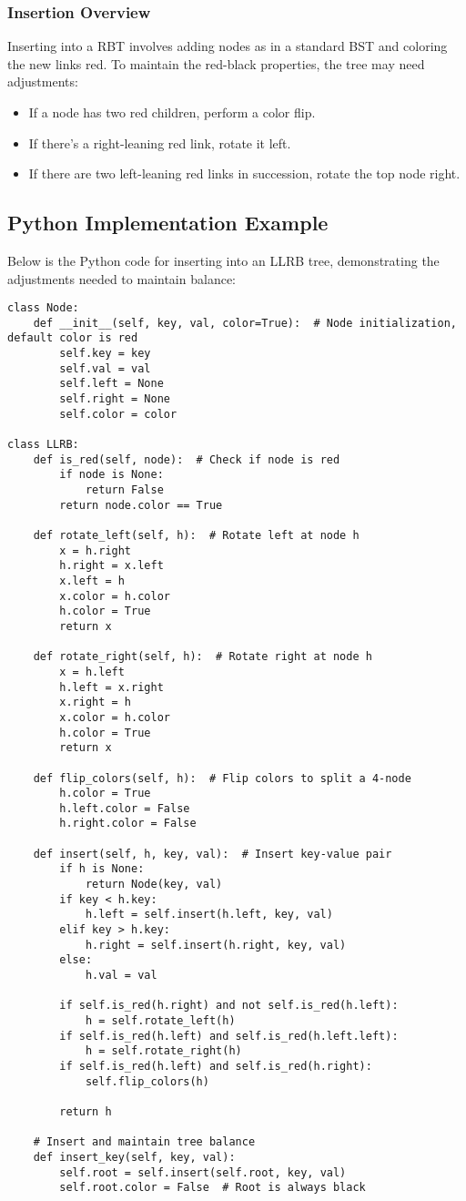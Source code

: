 \documentclass{article}
\begin{document}
\subsubsection{Insertion Overview}
Inserting into a RBT involves adding nodes as in a standard BST and coloring the new links red. To maintain the red-black properties, the tree may need adjustments:

\begin{itemize}
    \item If a node has two red children, perform a color flip.
    \item If there's a right-leaning red link, rotate it left.
    \item If there are two left-leaning red links in succession, rotate the top node right.
\end{itemize}

\subsection{Python Implementation Example}
Below is the Python code for inserting into an LLRB tree, demonstrating the adjustments needed to maintain balance:

\begin{verbatim}
class Node:
    def __init__(self, key, val, color=True):  # Node initialization, default color is red
        self.key = key
        self.val = val
        self.left = None
        self.right = None
        self.color = color

class LLRB:
    def is_red(self, node):  # Check if node is red
        if node is None:
            return False
        return node.color == True

    def rotate_left(self, h):  # Rotate left at node h
        x = h.right
        h.right = x.left
        x.left = h
        x.color = h.color
        h.color = True
        return x

    def rotate_right(self, h):  # Rotate right at node h
        x = h.left
        h.left = x.right
        x.right = h
        x.color = h.color
        h.color = True
        return x

    def flip_colors(self, h):  # Flip colors to split a 4-node
        h.color = True
        h.left.color = False
        h.right.color = False

    def insert(self, h, key, val):  # Insert key-value pair
        if h is None:
            return Node(key, val)
        if key < h.key:
            h.left = self.insert(h.left, key, val)
        elif key > h.key:
            h.right = self.insert(h.right, key, val)
        else:
            h.val = val

        if self.is_red(h.right) and not self.is_red(h.left):
            h = self.rotate_left(h)
        if self.is_red(h.left) and self.is_red(h.left.left):
            h = self.rotate_right(h)
        if self.is_red(h.left) and self.is_red(h.right):
            self.flip_colors(h)

        return h

    # Insert and maintain tree balance
    def insert_key(self, key, val):
        self.root = self.insert(self.root, key, val)
        self.root.color = False  # Root is always black
\end{verbatim}
\end{document}
